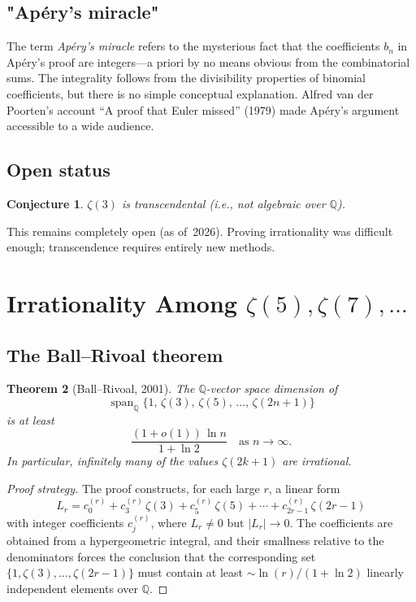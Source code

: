 \documentclass[12pt,a4paper]{amsart}
\newtheorem{theorem}{Theorem}[section]
\newtheorem{conjecture}[theorem]{Conjecture}
\theoremstyle{definition}
\theoremstyle{remark}
\begin{document}
\subsection{"Apéry's miracle"}

The term \emph{Apéry's miracle} refers to the mysterious fact that the
coefficients $b_n$ in Apéry's proof are integers---a priori by no means obvious
from the combinatorial sums. The integrality follows from the divisibility
properties of binomial coefficients, but there is no simple conceptual explanation.
Alfred van der Poorten's account ``A proof that Euler missed'' (1979) made Apéry's
argument accessible to a wide audience.

\subsection{Open status}

\begin{conjecture}
  $\zeta(3)$ is transcendental (i.e., not algebraic over $\mathbb{Q}$).
\end{conjecture}

This remains completely open (as of~2026). Proving irrationality was difficult
enough; transcendence requires entirely new methods.

\section{Irrationality Among $\zeta(5), \zeta(7), \ldots$}

\subsection{The Ball--Rivoal theorem}

\begin{theorem}[Ball--Rivoal, 2001]
  The $\mathbb{Q}$-vector space dimension of
  \[
    \operatorname{span}_{\mathbb{Q}}\{1,\, \zeta(3),\, \zeta(5),\, \ldots,\, \zeta(2n+1)\}
  \]
  is at least
  \[
    \frac{(1 + o(1))\,\ln n}{1 + \ln 2}
    \quad \text{as } n \to \infty.
  \]
  In particular, infinitely many of the values $\zeta(2k+1)$ are irrational.
\end{theorem}

\begin{proof}[Proof strategy]
  The proof constructs, for each large $r$, a linear form
  \[
    L_r = c_0^{(r)} + c_3^{(r)}\,\zeta(3) + c_5^{(r)}\,\zeta(5) + \cdots
          + c_{2r-1}^{(r)}\,\zeta(2r-1)
  \]
  with integer coefficients $c_j^{(r)}$, where $L_r \neq 0$ but $|L_r| \to 0$.
  The coefficients are obtained from a hypergeometric integral, and their
  smallness relative to the denominators forces the conclusion that the
  corresponding set $\{1, \zeta(3), \ldots, \zeta(2r-1)\}$ must contain at least
  $\sim \ln(r)/(1 + \ln 2)$ linearly independent elements over $\mathbb{Q}$.
\end{proof}
\end{document}
